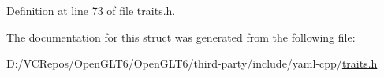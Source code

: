 Definition at line 73 of file traits.\+h.



The documentation for this struct was generated from the following file\+:\begin{DoxyCompactItemize}
\item 
D\+:/\+V\+C\+Repos/\+Open\+G\+L\+T6/\+Open\+G\+L\+T6/third-\/party/include/yaml-\/cpp/\mbox{\hyperlink{traits_8h}{traits.\+h}}\end{DoxyCompactItemize}
